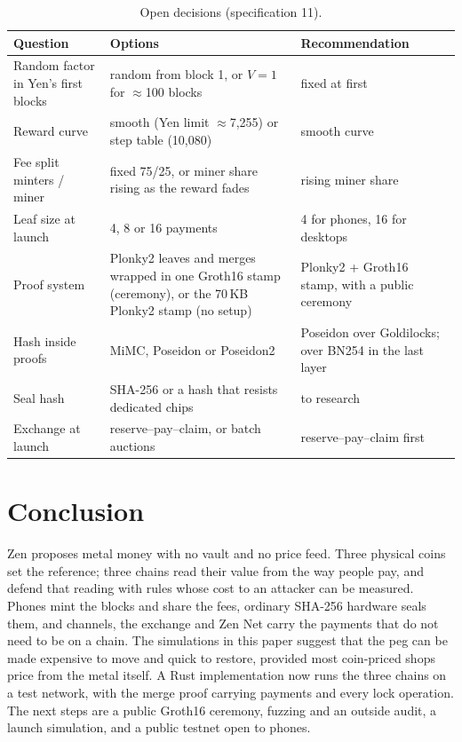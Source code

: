 \begin{table}[htbp]
\centering\small
\begin{tabularx}{\textwidth}{Y Y Y}
\toprule
\textbf{Question} & \textbf{Options} & \textbf{Recommendation}\\
\midrule
Random factor in Yen's first blocks & random from block 1, or $V=1$ for $\approx$100 blocks & fixed at first\\
Reward curve & smooth (Yen limit $\approx$7,255) or step table (10,080) & smooth curve\\
Fee split minters / miner & fixed 75/25, or miner share rising as the reward fades & rising miner share\\
Leaf size at launch & 4, 8 or 16 payments & 4 for phones, 16 for desktops\\
Proof system & Plonky2 leaves and merges wrapped in one Groth16 stamp (ceremony), or the 70\,KB Plonky2 stamp (no setup) & Plonky2 + Groth16 stamp, with a public ceremony\\
Hash inside proofs & MiMC, Poseidon or Poseidon2 & Poseidon over Goldilocks; over BN254 in the last layer\\
Seal hash & SHA-256 or a hash that resists dedicated chips & to research\\
Exchange at launch & reserve--pay--claim, or batch auctions & reserve--pay--claim first\\
\bottomrule
\end{tabularx}
\caption{Open decisions (specification 11).}
\label{tab:opendec}
\end{table}

\section{Conclusion}
Zen proposes metal money with no vault and no price feed. Three physical coins set the reference; three chains read their value from the way people pay, and defend that reading with rules whose cost to an attacker can be measured. Phones mint the blocks and share the fees, ordinary SHA-256 hardware seals them, and channels, the exchange and Zen Net carry the payments that do not need to be on a chain. The simulations in this paper suggest that the peg can be made expensive to move and quick to restore, provided most coin-priced shops price from the metal itself. A Rust implementation now runs the three chains on a test network, with the merge proof carrying payments and every lock operation. The next steps are a public Groth16 ceremony, fuzzing and an outside audit, a launch simulation, and a public testnet open to phones.

